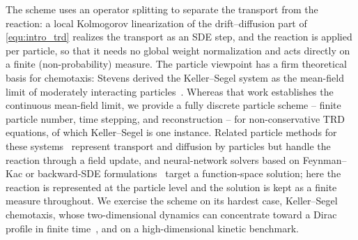 \documentclass[a4paper,fleqn]{cas-sc}
\theoremstyle{definition}
\theoremstyle{remark}
\begin{document}
The scheme uses an operator splitting to separate the transport from the reaction: a local Kolmogorov linearization of the drift--diffusion part of \eqref{equ:intro_trd} realizes the transport as an SDE step, and the reaction is applied per particle, so that it needs no global weight normalization and acts directly on a finite (non-probability) measure. The particle viewpoint has a firm theoretical basis for chemotaxis: Stevens derived the Keller--Segel system as the mean-field limit of moderately interacting particles~\cite{Stevens_SIAM_2000}. Whereas that work establishes the continuous mean-field limit, we provide a fully discrete particle scheme -- finite particle number, time stepping, and reconstruction -- for non-conservative TRD equations, of which Keller--Segel is one instance. Related particle methods for these systems~\cite{wang2025novel,hu2024stochastic,chertock2025hybrid} represent transport and diffusion by particles but handle the reaction through a field update, and neural-network solvers based on Feynman--Kac or backward-SDE formulations~\cite{han2024deep,hutzenthaler2021speed,nguwi2024deep,han2018solving,hure2020deep} target a function-space solution; here the reaction is represented at the particle level and the solution is kept as a finite measure throughout. We exercise the scheme on its hardest case, Keller--Segel chemotaxis, whose two-dimensional dynamics can concentrate toward a Dirac profile in finite time~\cite{herrero1997blow,perthame2007transport}, and on a high-dimensional kinetic benchmark.
\end{document}
